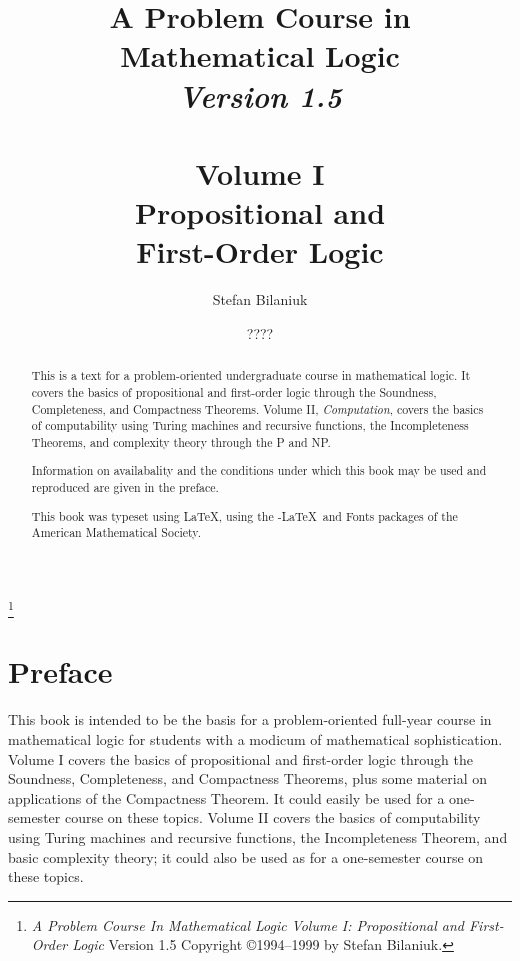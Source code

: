 \documentclass[12pt]{amsbook}
\theoremstyle{plain}
\theoremstyle{definition}
\theoremstyle{remark}
\begin{document}
\frontmatter

\title{A Problem Course in \\ Mathematical Logic \\ 
{\em Version 1.5\/} \\ \mbox{} \\ Volume I \\ Propositional and \\ First-Order Logic}
\author{Stefan Bilaniuk}
\date{????}
\address{Department of Mathematics\newline
\indent Trent University\newline
\indent Peterborough,  Ontario\newline
\indent Canada  K9J 7B8}
\thanks{ {\em A Problem Course In Mathematical Logic\/} \newline
{\em Volume I:  Propositional and First-Order Logic\/} \newline
{\sc Version 1.5} \newline
Copyright \copyright 1994--1999 by Stefan Bilaniuk.}
\begin{abstract}
This is a text for a problem-oriented undergraduate course in mathematical logic.  It covers the basics of propositional and first-order logic through the Soundness,  Completeness,  and Compactness Theorems.  Volume II,  {\em Computation\/},  covers the basics of computability using Turing machines and recursive functions,  the Incompleteness Theorems,  and complexity theory through the P and NP.

Information on availabality and the conditions under which this book may be used and reproduced are given in the preface.  

This book was typeset using \LaTeX,  using the \AmS-\LaTeX\ and \AmS Fonts packages of the American Mathematical Society.
\end{abstract}

\maketitle
\tableofcontents


%
%

\chapter*{Preface}

This book is intended to be the basis for a problem-oriented full-year course in mathematical logic for students with a modicum of mathematical sophistication.  Volume I covers the basics of propositional and first-order logic through the Soundness,  Completeness,  and Compactness Theorems,  plus some material on applications of the Compactness Theorem.  It could easily be used for a one-semester course on these topics.  Volume II covers the basics of computability using Turing machines and recursive functions,  the Incompleteness Theorem,  and basic complexity theory;  it could also be used as for a one-semester course on these topics.
\end{document}
